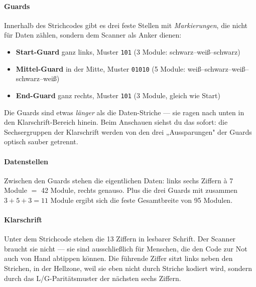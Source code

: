 \paragraph{Guards}
Innerhalb des Strichcodes gibt es drei feste Stellen mit
\emph{Markierungen}, die nicht für Daten zählen, sondern dem Scanner
als Anker dienen:

\begin{itemize}
\item \textbf{Start-Guard} ganz links, Muster \texttt{101} (3 Module:
  schwarz–weiß–schwarz)
\item \textbf{Mittel-Guard} in der Mitte, Muster \texttt{01010}
  (5 Module: weiß–schwarz–weiß–schwarz–weiß)
\item \textbf{End-Guard} ganz rechts, Muster \texttt{101} (3 Module,
  gleich wie Start)
\end{itemize}

Die Guards sind etwas \emph{länger} als die Daten-Striche — sie ragen
nach unten in den Klarschrift-Bereich hinein. Beim Anschauen siehst
du das sofort: die Sechsergruppen der Klarschrift werden von den drei
„Aussparungen" der Guards optisch sauber getrennt.

\paragraph{Datenstellen}
Zwischen den Guards stehen die eigentlichen Daten: links sechs
Ziffern à 7 Module $=$ 42 Module, rechts genauso. Plus die drei
Guards mit zusammen $3+5+3 = 11$ Module ergibt sich die feste
Gesamtbreite von 95 Modulen.

\paragraph{Klarschrift}
Unter dem Strichcode stehen die 13 Ziffern in lesbarer Schrift. Der
Scanner braucht sie nicht — sie sind ausschließlich für Menschen, die
den Code zur Not auch von Hand abtippen können. Die führende Ziffer
sitzt links neben den Strichen, in der Hellzone, weil sie eben nicht
durch Striche kodiert wird, sondern durch das L/G-Paritätsmuster der
nächsten sechs Ziffern.

